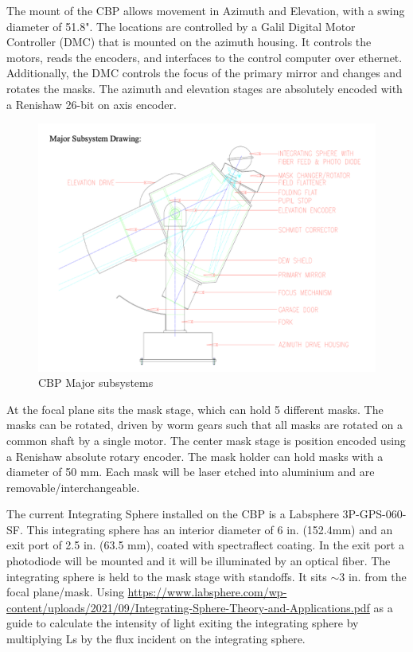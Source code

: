 \documentclass[SE,authoryear,toc]{article}
\begin{document}
\begin{table}[|||]
The mount of the CBP allows movement in Azimuth and Elevation, with a swing diameter of 51.8". 
The locations are controlled by a Galil Digital Motor Controller (DMC) that is mounted on the azimuth housing. It controls the motors, reads the encoders, and interfaces to the control computer over ethernet. 
Additionally, the DMC controls the focus of the primary mirror and changes and rotates the masks. 
The azimuth and elevation stages are absolutely encoded with a Renishaw 26-bit on axis encoder. 


\begin{figure}[h]
    \centering
    \includegraphics[width=\textwidth]{cbp_drawing.png}
    \caption{CBP Major subsystems}
    \label{fig:laser_power}
\end{figure}

At the focal plane sits the mask stage, which can hold 5 different masks. The masks can be rotated, driven by worm gears such that all masks are rotated on a common shaft by a single motor. The center mask stage is position encoded using a Renishaw absolute rotary encoder. The mask holder can hold masks with a diameter of 50 mm. Each mask will be laser etched into aluminium and are removable/interchangeable. 

The current Integrating Sphere installed on the CBP is a Labsphere 3P-GPS-060-SF. 
This integrating sphere has an interior diameter of 6 in. (152.4mm) and an exit port of 2.5 in. (63.5 mm), coated with spectraflect coating. 
In the exit port a photodiode will be mounted and it will be illuminated by an optical fiber.
The integrating sphere is held to the mask stage with standoffs. 
It sits $\sim 3$ in. from the focal plane/mask. 
Using \url{https://www.labsphere.com/wp-content/uploads/2021/09/Integrating-Sphere-Theory-and-Applications.pdf} as a guide to calculate the intensity of light exiting the integrating sphere by multiplying Ls by the flux incident on the integrating sphere.


\end{table}
\end{document}
